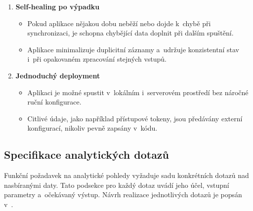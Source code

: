 \begin{enumerate}
  \item \textbf{Self-healing po výpadku}
    \begin{itemize}
      \item Pokud aplikace nějakou dobu neběží nebo dojde k~chybě při synchronizaci, je schopna chybějící data doplnit při dalším spuštění.
      \item Aplikace minimalizuje duplicitní záznamy a~udržuje konzistentní stav i~při opakovaném zpracování stejných vstupů.
    \end{itemize}

  \item \textbf{Jednoduchý deployment}
    \begin{itemize}
      \item Aplikaci je možné spustit v~lokálním i~serverovém prostředí bez náročné ruční konfigurace.
      \item Citlivé údaje, jako například přístupové tokeny, jsou předávány externí konfigurací, nikoliv pevně zapsány v~kódu.
    \end{itemize}
\end{enumerate}

\subsection{Specifikace analytických dotazů}
\label{subsec:requirements:queries}

Funkční požadavek na analytické pohledy vyžaduje sadu konkrétních dotazů nad nasbíranými daty. Tato podsekce pro každý dotaz uvádí jeho účel, vstupní parametry a~očekávaný výstup. Návrh realizace jednotlivých dotazů je popsán v~.

